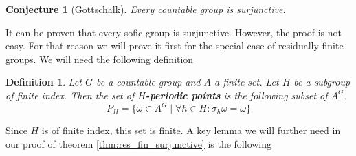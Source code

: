 \documentclass[titlepage, a4paper]{article}
\newtheorem{definition}[theorem]{Definition}
\newtheorem{conjecture}[theorem]{Conjecture}
\theoremstyle{remark}
\begin{document}
    \begin{conjecture}[Gottschalk] \label{conj:gottschalk}
        Every countable group is surjunctive.
    \end{conjecture}

    It can be proven that every sofic group is surjunctive. However, the proof is not easy. For that reason we will prove it first for the special case of residually finite groups. We will need the following definition

    \begin{definition}
	    Let $G$ be a countable group and $A$ a finite set. Let $H$ be a subgroup of finite index. Then the set of \textbf{$H$-periodic points} is the following subset of $A^G$.
        \[
        P_H = \{ \omega \in A^G  \mid \forall h \in H: \sigma_h\omega = \omega\}
        \]
    \end{definition}

    Since $H$ is of finite index, this set is finite. %
    A key lemma we will further need in our proof of theorem \ref{thm:res_fin_surjunctive} is the following
\end{document}
